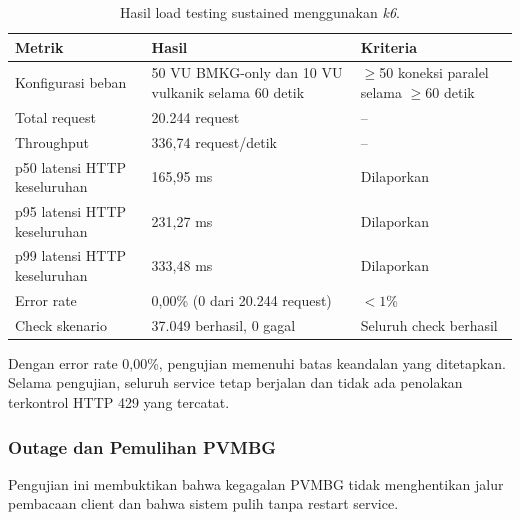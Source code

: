 \begin{table}[H]
  \centering
  \small
  \begin{tabularx}{\textwidth}{p{3.8cm}Xp{4cm}}
    \toprule
    Metrik & Hasil & Kriteria \\
    \midrule
    Konfigurasi beban & 50 VU BMKG-only dan 10 VU vulkanik selama 60 detik & $\geq$50 koneksi paralel selama $\geq$60 detik \\
    Total request & 20.244 request & -- \\
    Throughput & 336,74 request/detik & -- \\
    p50 latensi HTTP keseluruhan & 165,95 ms & Dilaporkan \\
    p95 latensi HTTP keseluruhan & 231,27 ms & Dilaporkan \\
    p99 latensi HTTP keseluruhan & 333,48 ms & Dilaporkan \\
    Error rate & 0,00\% (0 dari 20.244 request) & $<1$\% \\
    Check skenario & 37.049 berhasil, 0 gagal & Seluruh check berhasil \\
    \bottomrule
  \end{tabularx}
  \caption{Hasil load testing sustained menggunakan \textit{k6}.}
  \label{tab:problem-dua-beban}
\end{table}

Dengan error rate 0,00\%, pengujian memenuhi batas keandalan yang ditetapkan.
Selama pengujian, seluruh service tetap berjalan dan tidak ada penolakan
terkontrol HTTP 429 yang tercatat.

\subsubsection{Outage dan Pemulihan PVMBG}
Pengujian ini membuktikan bahwa kegagalan PVMBG tidak menghentikan jalur
pembacaan client dan bahwa sistem pulih tanpa restart service.

